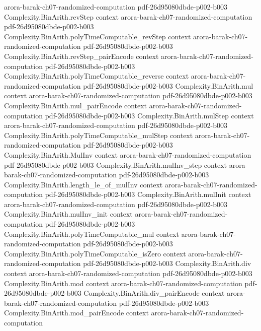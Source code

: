 \begin{theorem}
  {arora-barak-ch07-randomized-computation}
  {pdf-26d95080dbde-p002-b003}
\proofstep
  {Complexity.BinArith.revStep}
  {context}
  {arora-barak-ch07-randomized-computation}
  {pdf-26d95080dbde-p002-b003}
\proofstep
  {Complexity.BinArith.polyTimeComputable_revStep}
  {context}
  {arora-barak-ch07-randomized-computation}
  {pdf-26d95080dbde-p002-b003}
\proofstep
  {Complexity.BinArith.revStep_pairEncode}
  {context}
  {arora-barak-ch07-randomized-computation}
  {pdf-26d95080dbde-p002-b003}
\proofstep
  {Complexity.BinArith.polyTimeComputable_reverse}
  {context}
  {arora-barak-ch07-randomized-computation}
  {pdf-26d95080dbde-p002-b003}
\proofstep
  {Complexity.BinArith.mul}
  {context}
  {arora-barak-ch07-randomized-computation}
  {pdf-26d95080dbde-p002-b003}
\proofstep
  {Complexity.BinArith.mul_pairEncode}
  {context}
  {arora-barak-ch07-randomized-computation}
  {pdf-26d95080dbde-p002-b003}
\proofstep
  {Complexity.BinArith.mulStep}
  {context}
  {arora-barak-ch07-randomized-computation}
  {pdf-26d95080dbde-p002-b003}
\proofstep
  {Complexity.BinArith.polyTimeComputable_mulStep}
  {context}
  {arora-barak-ch07-randomized-computation}
  {pdf-26d95080dbde-p002-b003}
\proofstep
  {Complexity.BinArith.MulInv}
  {context}
  {arora-barak-ch07-randomized-computation}
  {pdf-26d95080dbde-p002-b003}
\proofstep
  {Complexity.BinArith.mulInv_step}
  {context}
  {arora-barak-ch07-randomized-computation}
  {pdf-26d95080dbde-p002-b003}
\proofstep
  {Complexity.BinArith.length_le_of_mulInv}
  {context}
  {arora-barak-ch07-randomized-computation}
  {pdf-26d95080dbde-p002-b003}
\proofstep
  {Complexity.BinArith.mulInit}
  {context}
  {arora-barak-ch07-randomized-computation}
  {pdf-26d95080dbde-p002-b003}
\proofstep
  {Complexity.BinArith.mulInv_init}
  {context}
  {arora-barak-ch07-randomized-computation}
  {pdf-26d95080dbde-p002-b003}
\proofstep
  {Complexity.BinArith.polyTimeComputable_mul}
  {context}
  {arora-barak-ch07-randomized-computation}
  {pdf-26d95080dbde-p002-b003}
\proofstep
  {Complexity.BinArith.polyTimeComputable_isZero}
  {context}
  {arora-barak-ch07-randomized-computation}
  {pdf-26d95080dbde-p002-b003}
\proofstep
  {Complexity.BinArith.div}
  {context}
  {arora-barak-ch07-randomized-computation}
  {pdf-26d95080dbde-p002-b003}
\proofstep
  {Complexity.BinArith.mod}
  {context}
  {arora-barak-ch07-randomized-computation}
  {pdf-26d95080dbde-p002-b003}
\proofstep
  {Complexity.BinArith.div_pairEncode}
  {context}
  {arora-barak-ch07-randomized-computation}
  {pdf-26d95080dbde-p002-b003}
\proofstep
  {Complexity.BinArith.mod_pairEncode}
  {context}
  {arora-barak-ch07-randomized-computation}

\end{theorem}
